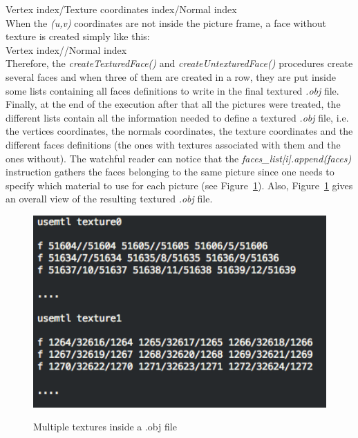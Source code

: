 \noindent Vertex index/Texture coordinates index/Normal index \\

When the \textit{(u,v)} coordinates are not inside the picture frame, a face without texture is created simply like this:\\

\noindent Vertex index//Normal index \\

Therefore, the \textit{createTexturedFace()} and \textit{createUntexturedFace()} procedures create several faces and when three of them are created in a row, they are put inside some lists containing all faces definitions to write in the final textured \textit{.obj} file.\\  

Finally, at the end of the execution after that all the pictures were treated, the different lists contain all the information needed to define a textured \textit{.obj} file, i.e. the vertices coordinates, the normals coordinates, the texture coordinates and the different faces definitions (the ones with textures associated with them and the ones without). The watchful reader can notice that the \textit{faces\_list[i].append(faces)} instruction gathers the faces belonging to the same picture since one needs to specify which material to use for each picture (see Figure~\ref{fig:multipleTextureOBJFile}). Also, Figure~\ref{fig:multipleTextureOBJFile} gives an overall view of the resulting textured \textit{.obj} file.

\begin{figure}
\caption{Multiple textures inside a .obj file}
\centering
    \includegraphics[width=1.0\textwidth]{images/multipleTextureOBJFile.png}
\label{fig:multipleTextureOBJFile}
\end{figure}

